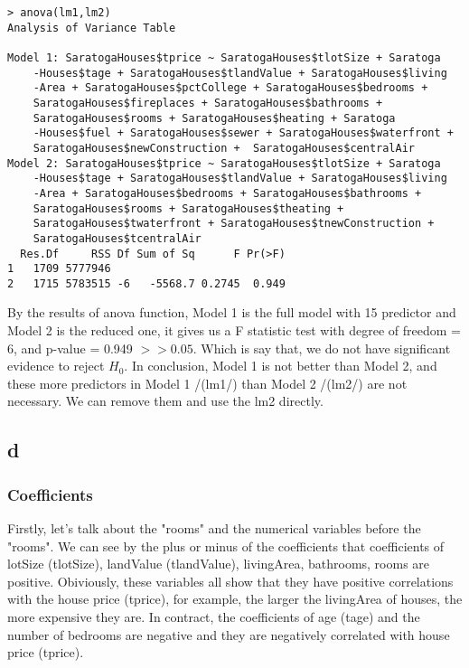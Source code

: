 \documentclass[12pt]{article}
\begin{document}
\begin{verbatim}
> anova(lm1,lm2)
Analysis of Variance Table

Model 1: SaratogaHouses$tprice ~ SaratogaHouses$tlotSize + Saratoga
    -Houses$tage + SaratogaHouses$tlandValue + SaratogaHouses$living
    -Area + SaratogaHouses$pctCollege + SaratogaHouses$bedrooms + 
    SaratogaHouses$fireplaces + SaratogaHouses$bathrooms + 
    SaratogaHouses$rooms + SaratogaHouses$heating + Saratoga
    -Houses$fuel + SaratogaHouses$sewer + SaratogaHouses$waterfront + 
    SaratogaHouses$newConstruction +  SaratogaHouses$centralAir
Model 2: SaratogaHouses$tprice ~ SaratogaHouses$tlotSize + Saratoga
    -Houses$tage + SaratogaHouses$tlandValue + SaratogaHouses$living
    -Area + SaratogaHouses$bedrooms + SaratogaHouses$bathrooms + 
    SaratogaHouses$rooms + SaratogaHouses$theating + 
    SaratogaHouses$twaterfront + SaratogaHouses$tnewConstruction + 
    SaratogaHouses$tcentralAir
  Res.Df     RSS Df Sum of Sq      F Pr(>F)
1   1709 5777946                           
2   1715 5783515 -6   -5568.7 0.2745  0.949
\end{verbatim}
By the results of anova function, Model 1 is the full model with 15 predictor and Model 2 is the reduced one, it gives us a F statistic test with degree of freedom = 6, and p-value = 0.949 $>> 0.05$. Which is say that, we do not have significant evidence to reject $H_0$. In conclusion, Model 1 is not better than Model 2, and these more predictors in Model 1 /(lm1/) than Model 2 /(lm2/) are not necessary. We can remove them and use the lm2 directly.







\subsection{d}
\subsubsection{Coefficients}
Firstly, let's talk about the "rooms" and the numerical variables before the "rooms". We can see by the plus or minus of the coefficients that coefficients of lotSize (tlotSize), landValue (tlandValue), livingArea, bathrooms, rooms are positive. Obiviously, these variables all show that they have positive correlations with the house price (tprice), for example, the larger the livingArea of houses, the more expensive they are. In contract, the coefficients of age (tage) and the number of bedrooms are negative and they are negatively correlated with house price (tprice). 
\end{document}
